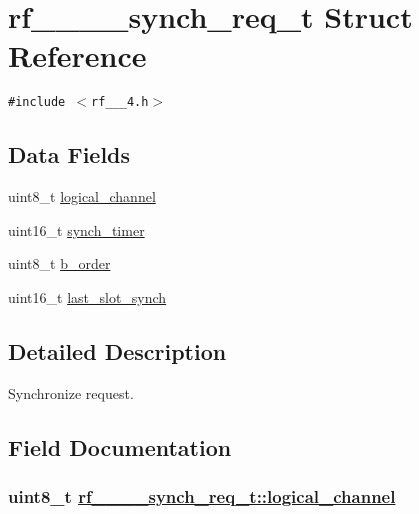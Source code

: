 \hypertarget{structrf__802__15__4__synch__req__t}{
\section{rf\_\_\_\_\-synch\_\-req\_\-t Struct Reference}
\label{structrf__802__15__4__synch__req__t}
}
{\tt \#include $<$rf\_\_\_\-4.h$>$}

\subsection*{Data Fields}
\begin{CompactItemize}
\item 
uint8\_\-t \hyperlink{structrf__802__15__4__synch__req__t_5cde0c85fe36632ff8267a2173e187cd}{logical\_\-channel}
\item 
uint16\_\-t \hyperlink{structrf__802__15__4__synch__req__t_cebd13aabb32a619c972e9edbf9b26f2}{synch\_\-timer}
\item 
uint8\_\-t \hyperlink{structrf__802__15__4__synch__req__t_a9ae4f231cda108988b95407c9053888}{b\_\-order}
\item 
uint16\_\-t \hyperlink{structrf__802__15__4__synch__req__t_82ae23950d975bb6d356beaf05bbab50}{last\_\-slot\_\-synch}
\end{CompactItemize}


\subsection{Detailed Description}
Synchronize request. 



\subsection{Field Documentation}
\hypertarget{structrf__802__15__4__synch__req__t_5cde0c85fe36632ff8267a2173e187cd}{
\subsubsection[logical\_\-channel]{\setlength{\rightskip}{0pt plus 5cm}uint8\_\-t \hyperlink{structrf__802__15__4__synch__req__t_5cde0c85fe36632ff8267a2173e187cd}{rf\_\_\_\_\-synch\_\-req\_\-t::logical\_\-channel}}}
\label{structrf__802__15__4__synch__req__t_5cde0c85fe36632ff8267a2173e187cd}


